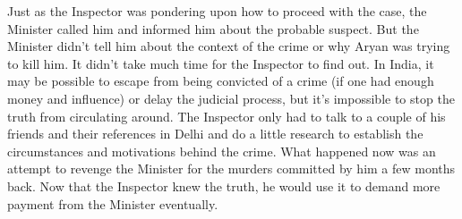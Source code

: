 Just as the Inspector was pondering upon how to proceed with the case, the
Minister called him and informed him about the probable suspect. But the
Minister didn't tell him about the context of the crime or why Aryan was trying
to kill him. It didn't take much time for the Inspector to find out. In India,
it may be possible to escape from being convicted of a crime (if one had enough
money and influence) or delay the judicial process, but it's impossible to stop
the truth from circulating around. The Inspector only had to talk to a couple of
his friends and their references in Delhi and do a little research to establish
the circumstances and motivations behind the crime. What happened now was an
attempt to revenge the Minister for the murders committed by him a few months
back. Now that the Inspector knew the truth, he would use it to demand more
payment from the Minister eventually.